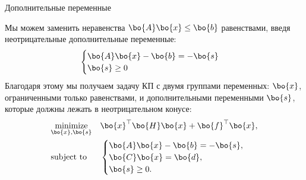 \documentclass{beamer}
\begin{document}
\begin{frame}{Дополнительные переменные}
	\begin{flushleft}
		
		Мы можем заменить неравенства $\bo{A}\bo{x} \leq \bo{b}$ равенствами, введя неотрицательные дополнительные переменные:
		\begin{align}
			\begin{cases}
				\bo{A}\bo{x} - \bo{b} =  -\bo{s} \\
				\bo{s} \geq 0
			\end{cases}
		\end{align}
		Благодаря этому мы получаем задачу КП с двумя группами переменных: $\bo{x}$, ограниченными только равенствами, и дополнительными переменными $\bo{s}$, которые должны лежать в неотрицательном конусе:
		\begin{equation}
			\begin{aligned}
				& \underset{\bo{x}, \bo{s}}{\text{minimize}}
				& & \bo{x}^\top \bo{H} \bo{x} + \bo{f}^\top\bo{x}, \\
				& \text{subject to}
				& & \begin{cases}
					\bo{A}\bo{x} - \bo{b} =  -\bo{s}, \\
					\bo{C}\bo{x} = \bo{d}, \\
					\bo{s} \geq 0.
				\end{cases}
			\end{aligned}
		\end{equation}
		
		
	\end{flushleft}
\end{frame}
\end{document}
